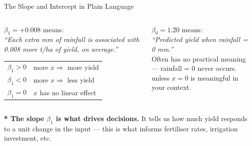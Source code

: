 \documentclass[aspectratio=169,10pt]{beamer}
\begin{document}
\begin{frame}{The Slope and Intercept in Plain Language}
  \begin{columns}
      \begin{tcolorbox}[mybox,title={\bfseries Slope $\beta_1$ --- the key number}]
        \small $\beta_1 = +0.008$ means:\\[6pt]
        \textit{``Each extra mm of rainfall is associated with
        0.008 more t/ha of yield, on average.''}\\[8pt]
        \begin{tabular}{ll}
          $\beta_1 > 0$ & more $x \Rightarrow$ more yield \\
          $\beta_1 < 0$ & more $x \Rightarrow$ less yield \\
          $\beta_1 = 0$ & $x$ has no linear effect \\
        \end{tabular}
      \end{tcolorbox}
      \begin{tcolorbox}[mybox,title={\bfseries Intercept $\beta_0$ --- handle with care}]
        \small $\beta_0 = 1.20$ means:\\[6pt]
        \textit{``Predicted yield when rainfall = 0 mm.''}\\[8pt]
        Often has no practical meaning --- rainfall = 0 never occurs.\\[6pt]
         unless $x = 0$ is meaningful
        in your context.
      \end{tcolorbox}
  \end{columns}
  \vspace{0.4cm}
  \begin{tcolorbox}[keybox]
    \small\textbf{\textbf{*} The slope $\beta_1$ is what drives decisions.}
    It tells us how much yield responds to a unit change in the input ---
    this is what informs fertiliser rates, irrigation investment, etc.
  \end{tcolorbox}
\end{frame}
\end{document}

